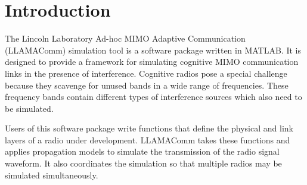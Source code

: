 %
%
%
%
%

\chapter{Introduction}

The Lincoln Laboratory Ad-hoc MIMO Adaptive Communication
(LLAMAComm) simulation tool is a software package written in MATLAB.
It is designed to provide a framework for simulating cognitive MIMO
communication links in the presence of interference.  Cognitive
radios pose a special challenge because they scavenge for unused
bands in a wide range of frequencies.  These frequency bands contain
different types of interference sources which also need to be
simulated.

Users of this software package write functions that define the
physical and link layers of a radio under development.  LLAMAComm
takes these functions and applies propagation models to simulate the
transmission of the radio signal waveform.  It also coordinates the
simulation so that multiple radios may be simulated simultaneously.


